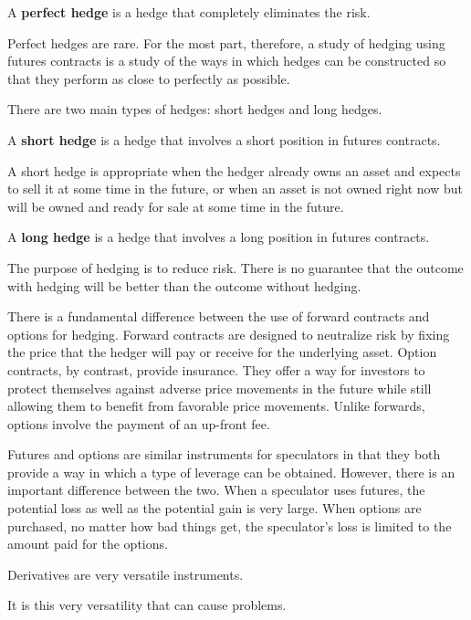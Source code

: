 A \textbf{perfect hedge} is a hedge that completely eliminates the risk.
\ed

Perfect hedges are rare. For the most part, therefore, a study of hedging using futures contracts is a study of the
ways in which hedges can be constructed so that they perform as close to perfectly as possible.

There are two main types of hedges: short hedges and long hedges.

A \textbf{short hedge} is a hedge that involves a short position in futures contracts.
\ed

A short hedge is appropriate when the hedger already owns an asset and expects to sell it at some time in the
future, or when an asset is not owned right now but will be owned and ready for sale at some time in the future.

A \textbf{long hedge} is a hedge that involves a long position in futures contracts.
\ed

The purpose of hedging is to reduce risk. There is no guarantee that the outcome with hedging will be better than the
outcome without hedging.

There is a fundamental difference between the use of forward contracts and options for hedging. Forward contracts
are designed to neutralize risk by fixing the price that the hedger will pay or receive for the underlying asset.
Option contracts, by contrast, provide insurance. They offer a way for investors to protect themselves against
adverse price movements in the future while still allowing them to benefit from favorable price movements. Unlike
forwards, options involve the payment of an up-front fee.

Futures and options are similar instruments for speculators in that they both provide a way in which a type of
leverage can be obtained. However, there is an important difference between the two. When a speculator uses futures,
the potential loss as well as the potential gain is very large. When options are purchased, no matter how bad things
get, the speculator's loss is limited to the amount paid for the options.

Derivatives are very versatile instruments.

It is this very versatility that can cause problems.